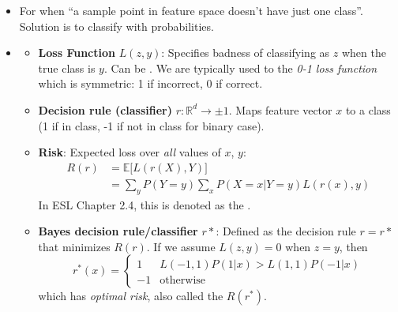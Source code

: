\documentclass[12pt]{article}
\begin{document}
\begin{itemize}
	\item For when ``a sample point in feature space doesn't have just one class''. Solution is to classify with probabilities.
	\item {}
	\begin{itemize}
		\item \textbf{Loss Function} $L(z, y)$: Specifies badness of classifying as $z$ when the true class is $y$. Can be . We are typically used to the \textit{0-1 loss function} which is symmetric: 1 if incorrect, 0 if correct.

		\item \textbf{Decision rule (classifier)} $r : \mathbb{R}^d \rightarrow \pm 1$. Maps feature vector $x$ to a class (1 if in class, -1 if not in class for binary case).

		\item \textbf{Risk}: Expected loss over \textit{all} values of $x$, $y$:
		\begin{align}
			R(r) &= \mathbb{E} \big[ L(r(X), Y) \big]  \\
			&= \sum_y P(Y = y) \sum_x P(X = x | Y = y) L(r(x), y)
		\end{align}
		In ESL Chapter 2.4, this is denoted as the .

		\item \textbf{Bayes decision rule/classifier} $r*$: Defined as the decision rule $r = r*$ that minimizes $R(r)$. If we assume $L(z, y) = 0$ when $z = y$, then
		\begin{equation}
			r^*(x) = \begin{cases}
				1 & L(-1, 1) P(1 | x) > L(1, 1) P(-1 | x) \\
				-1 & \text{otherwise}
			\end{cases}
		\end{equation}
		which has \textit{optimal risk}, also called the  $R(r^*)$.
	\end{itemize}


\end{itemize}
\end{document}
